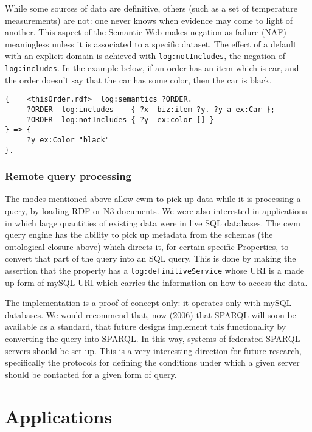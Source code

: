\documentclass{tlp}
\begin{document}
\par While some sources of data are definitive, others (such as a set
of temperature measurements) are not: one never knows when evidence
may come to light of another. This aspect of the Semantic Web makes
negation as failure (NAF) meaningless unless it is associated to a
specific dataset. The effect of a default with an explicit domain
is achieved with {\tt log:notIncludes}, the negation of
{\tt log:includes}. In the example below, if an order has an
item which is car, and the order doesn't say that the car has some
color, then the car is black.
\begin{verbatim}
{    <thisOrder.rdf>  log:semantics ?ORDER.
     ?ORDER  log:includes    { ?x  biz:item ?y. ?y a ex:Car };
     ?ORDER  log:notIncludes { ?y  ex:color [] }
} => {
     ?y ex:Color "black"
}.
\end{verbatim}
\subsubsection{Remote query processing}
  

\par The modes mentioned above allow cwm to pick up data while it is
processing a query, by loading RDF or N3 documents. We were also
interested in applications in which large quantities of existing
data were in live SQL databases. The cwm query engine has the
ability to pick up metadata from the schemas (the ontological
closure above) which directs it, for certain specific Properties,
to convert that part of the query into an SQL query. This is done
by making the assertion that the property has a
{\tt log:definitiveService} whose URI is a made up form of
mySQL URI which carries the information on how to access the
data.

\par The implementation is a proof of concept only: it operates only
with mySQL databases. We would recommend that, now (2006) that
SPARQL will soon be available as a standard, that future designs
implement this functionality by converting the query into SPARQL.
In this way, systems of federated SPARQL servers should be set up.
This is a very interesting direction for future research,
specifically the protocols for defining the conditions under which
a given server should be contacted for a given form of query.
\section{Applications}
  
\end{document}
